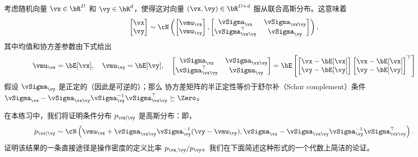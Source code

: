 \documentclass[../../book-main_zh.tex]{subfiles}
\begin{document}
\begin{exercise}\label{exercise:conditional_gaussian}
    考虑随机向量 $\vx \in \bR^D$ 和 $\vy \in \bR^d$，使得这对向量
    $(\vx, \vy) \in \bR^{D + d}$ 服从联合高斯分布。这意味着
    \begin{equation*}
        \begin{bmatrix}
            \vx \\
            \vy
        \end{bmatrix}
        \sim
        \cN \left(
            \begin{bmatrix}
                \vmu_{\vx} \\
                \vmu_{\vy}
            \end{bmatrix}
            ,
            \begin{bmatrix}
                \vSigma_{\vx} & \vSigma_{\vx\vy} \\
                \vSigma_{\vx\vy}^\top & \vSigma_{\vy}
            \end{bmatrix}
        \right),
    \end{equation*}
    其中均值和协方差参数由下式给出
    \begin{equation*}
        \vmu_{\vx} = \bE[\vx],\quad \vmu_{\vy} = \bE[\vy],\quad
        \begin{bmatrix}
            \vSigma_{\vx} & \vSigma_{\vx\vy} \\
            \vSigma_{\vx\vy}^\top & \vSigma_{\vy}
        \end{bmatrix}
        =
        \bE\left[
            \begin{bmatrix}
                \vx - \bE[\vx] \\
                \vy - \bE[\vy]
            \end{bmatrix}
            \begin{bmatrix}
                \vx - \bE[\vx] \\
                \vy - \bE[\vy]
            \end{bmatrix}^\top
        \right]
    \end{equation*}
    假设 $\vSigma_{\vy}$ 是正定的（因此是可逆的）；那么
    协方差矩阵的半正定性等价于舒尔补（Schur complement）条件
    $\vSigma_{\vx} - \vSigma_{\vx\vy} \vSigma_{\vy}^{-1}
    \vSigma_{\vx\vy}^\top \succeq \Zero$。

    在本练习中，我们将证明条件分布
    $p_{\vx \mid \vy}$ 是高斯分布：即，
    \begin{equation}\label{eq:gaussian-conditional-eqn}
        p_{\vx \mid \vy} \sim \cN\left(
            \vmu_{\vx} + \vSigma_{\vx\vy} \vSigma_{\vy}^{-1} (\vy
            - \vmu_{\vy}),
            \vSigma_{\vx} - \vSigma_{\vx\vy} \vSigma_{\vy}^{-1}
            \vSigma_{\vx\vy}^{\top}
        \right).
    \end{equation}
    证明该结果的一条直接途径是操作密度的定义比率
    $p_{\vx, \vy} / p_{\vy}$。我们在下面简述这种形式的一个代数上简洁的论证。


\end{exercise}
\end{document}
